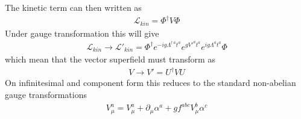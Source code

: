 The kinetic term can then written as
\begin{align}
    \mathcal{L}_{kin}=\Phi^{\dagger}V\Phi
\end{align}
Under gauge transformation this will give
\begin{align}
    \mathcal{L}_{kin}\rightarrow\mathcal{L'}_{kin}=\Phi^{\dagger}e^{-ig\Lambda^{\dagger\,a}t^{a}}e^{gV'^{a}t^{a}}e^{ig\Lambda^{a}t^{a}}\Phi
\end{align}
which mean that the vector superfield must transform as
\begin{align}
    V\rightarrow V'=U^{\dagger}VU
\end{align}
On infinitesimal and component form this reduces to the standard non-abelian gauge transformations
\begin{align}
    V_{\mu}^{a}=V_{\mu}^{a}+\partial_{\mu}\alpha^{a}+gf^{abc}V_{\mu}^{b}\alpha^{c}
\end{align}

